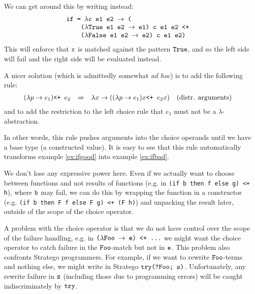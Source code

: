 \documentclass[fleqn]{article}
\newcommand{\ve}[1]{\ensuremath{\text{\tt #1}}}
\newcommand{\vve}[1]{{\tt #1}}
\newcommand{\ra}{\ensuremath{\rightarrow} }
\newcommand{\Ra}{\ensuremath{\Rightarrow} }
\newcommand{\plus}{\ve{ <+ } }
\begin{document}
We can get around this by writing instead:
\begin{equation}
\label{ex:ifbad}
\begin{array}{l}
\ve{if = $\lambda$c e1 e2 \ra (} \\
\ve{\quad \quad ($\lambda$True e1 e2 \ra e1) c e1 e2 <+} \\
\ve{\quad \quad ($\lambda$False e1 e2 \ra e2) c e1 e2)}
\end{array}
\end{equation}
This will enforce that \ve{c} is matched against the
pattern \ve{True}, and so the left side will fail and the right side
will be evaluated instead.

A nicer solution (which is admittedly somewhat {\em ad hoc}) is to add
the following rule:
\[
\begin{array}{rcll}
(\lambda p \ra e_1) \plus e_2 & \Ra 
  & \lambda x \ra ((\lambda p \ra e_1) x \plus e_2 x)
  & \text{(distr. arguments)}
\end{array}
\]
and to add the restriction to the left choice rule that $e_1$ must not
be a $\lambda$-abstraction.

In other words, this rule pushes arguments into the choice operands
until we have a base type (a constructed value).  It is easy to see
that this rule automatically transforms example \ref{ex:ifgood} into
example \ref{ex:ifbad}.

We don't lose any expressive power here.  Even if we actually want to
choose between functions and not results of functions (e.g. in \vve{(if
  b then f else g) <+ h}), where \ve{b} may fail, we can do
this by wrapping the function in a constructor (e.g. \vve{(if b then F
  f else F g) <+ (F h)}) and unpacking the result later, outside of
the scope of the choice operator.


A problem with the choice operator is that we do not have control over
the scope of the failure handling, e.g. in \ve{($\lambda$Foo \ra e)
  <+ ...} we might want the choice operator to catch failure in
the \ve{Foo}-match but not in \ve{e}.  This problem also confronts
Stratego programmers.  For example, if we want to rewrite
\ve{Foo}-terms and nothing else, we might write in Stratego
\ve{try(?Foo; s)}.  Unfortunately, any rewrite failure in \ve{s}
(including those due to programming errors) will be caught
indiscriminately by \ve{try}.
\end{document}
